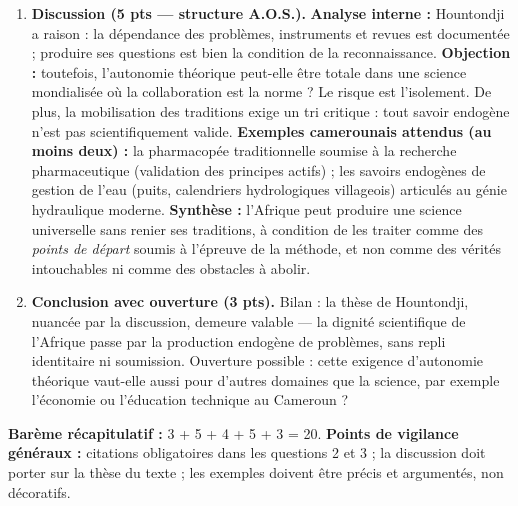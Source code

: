 \documentclass[11pt]{article}
\begin{document}
\begin{exoresolu}
\begin{enumerate}
\item \textbf{Discussion (5 pts — structure A.O.S.).} \textbf{Analyse interne :} Hountondji a raison : la dépendance des problèmes, instruments et revues est documentée ; produire ses questions est bien la condition de la reconnaissance. \textbf{Objection :} toutefois, l'autonomie théorique peut-elle être totale dans une science mondialisée où la collaboration est la norme ? Le risque est l'isolement. De plus, la mobilisation des traditions exige un tri critique : tout savoir endogène n'est pas scientifiquement valide. \textbf{Exemples camerounais attendus (au moins deux) :} la pharmacopée traditionnelle soumise à la recherche pharmaceutique (validation des principes actifs) ; les savoirs endogènes de gestion de l'eau (puits, calendriers hydrologiques villageois) articulés au génie hydraulique moderne. \textbf{Synthèse :} l'Afrique peut produire une science universelle sans renier ses traditions, à condition de les traiter comme des \emph{points de départ} soumis à l'épreuve de la méthode, et non comme des vérités intouchables ni comme des obstacles à abolir.
\item \textbf{Conclusion avec ouverture (3 pts).} Bilan : la thèse de Hountondji, nuancée par la discussion, demeure valable — la dignité scientifique de l'Afrique passe par la production endogène de problèmes, sans repli identitaire ni soumission. Ouverture possible : cette exigence d'autonomie théorique vaut-elle aussi pour d'autres domaines que la science, par exemple l'économie ou l'éducation technique au Cameroun ?
\end{enumerate}
\textbf{Barème récapitulatif :} 3 + 5 + 4 + 5 + 3 = 20. \textbf{Points de vigilance généraux :} citations obligatoires dans les questions 2 et 3 ; la discussion doit porter sur la thèse du texte ; les exemples doivent être précis et argumentés, non décoratifs.
\end{exoresolu}
\end{document}
